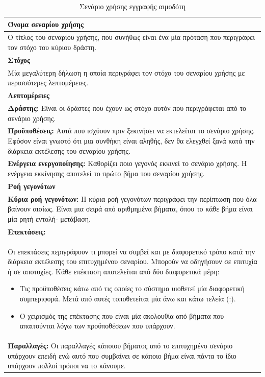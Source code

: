  
\begin{table}[H]
	\begin{center}
	    \begin{tabular}{|p{\dimexpr \linewidth-2\tabcolsep}|}
	    \hline
	    \rowcolor{grayy}
	    \textbf{Όνομα σεναρίου χρήσης}
	    \\ \hline    
	    Ο τίτλος του σεναρίου χρήσης, που συνήθως είναι ένα μία πρόταση που περιγράφει τον στόχο του κύριου δράστη.
	    \\ \hline
	    \rowcolor{grayy}
	    \textbf{Στόχος}
	    \\ \hline
 Μία μεγαλύτερη δήλωση η οποία περιγράφει τον στόχο του σεναρίου χρήσης με περισσότερες λεπτομέρειες.
	    \\ \hline
	    \rowcolor{grayy}
	    \textbf{Λεπτομέρειες}
	    \\ \hline
		\textbf{Δράστης:} Είναι οι δράστες που έχουν ως στόχο αυτόν που περιγράφεται από το σενάριο χρήσης.
		\\ \hline
		\textbf{Προϋποθέσεις:} Αυτά που ισχύουν πριν ξεκινήσει να εκτελείται το σενάριο χρήσης. Εφόσον είναι γνωστό ότι μια συνθήκη είναι αληθής, δεν θα ελεγχθεί ξανά κατά την διάρκεια εκτέλεσης του σεναρίου χρήσης. 
		\\ \hline
		\textbf{Ενέργεια ενεργοποίησης:} Καθορίζει ποιο γεγονός εκκινεί το σενάριο χρήσης. Η ενέργεια εκκίνησης αποτελεί το πρώτο βήμα του σεναρίου χρήσης. 
		\\ \hline
		\rowcolor{grayy}    
	    \textbf{Ροή γεγονότων}
	    \\ \hline
		\textbf{Κύρια ροή γεγονότων:}
		Η κύρια ροή γεγονότων περιγράφει την περίπτωση που όλα βαίνουν αισίως. Είναι μια σειρά από αριθμημένα βήματα, όπου το κάθε βήμα είναι μία ρητή εντολή- μετάβαση.
		\\ \hline
		\rowcolor{grayy}
		\textbf{Επεκτάσεις:}
		\\ \hline 
Οι επεκτάσεις περιγράφουν τι μπορεί να συμβεί και με διαφορετικό τρόπο κατά την διάρκεια εκτέλεσης του επιτυχημένου σεναρίου. Μπορούν να οδηγήσουν σε επιτυχία ή σε αποτυχίες. Κάθε επέκταση αποτελείται από δύο διαφορετικά μέρη:
 \begin{itemize}
 \item Τις προϋποθέσεις κάτω από τις οποίες το σύστημα υιοθετεί μία διαφορετική συμπεριφορά. Μετά από αυτές τοποθετείται μία άνω και κάτω τελεία (:).
 \item Ο χειρισμός της επέκτασης που είναι μία ακολουθία από βήματα που απαιτούνται λόγω των προϋποθέσεων που υπάρχουν.
 \end{itemize}
		\\ \hline
		\textbf{Παραλλαγές:}
		 Οι παραλλαγές κάποιου βήματος από το επιτυχημένο σενάριο υπάρχουν επειδή ενώ αυτό που συμβαίνει σε κάποιο βήμα είναι πάντα το ίδιο υπάρχουν πολλοί τρόποι να το κάνουμε.
		 \\ \hline

	    \end{tabular}
	    \caption{Σενάριο χρήσης εγγραφής αιμοδότη}
		\label{tab:use_case_sample_table}
	\end{center}
\end{table}
 

